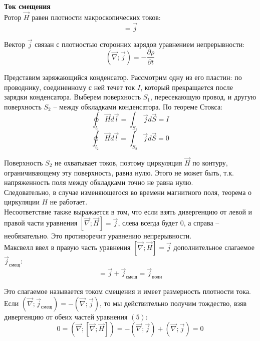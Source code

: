 \documentclass{article}
\begin{document}
	
	\textbf{Ток смещения}\\

	Ротор $\vec H$ равен плотности макроскопических токов:
	\begin{equation}
		[\vec\nabla;\vec H] = \vec j
	\end{equation}

	Вектор $\vec j$ связан с плотностью сторонних зарядов уравнением непрерывности:
	\begin{equation}
		(\vec\nabla;\vec j) = -\frac{\partial\rho}{\partial t}
	\end{equation}

	Представим заряжающийся конденсатор. Рассмотрим одну из его пластин: по проводнику, соединенному с ней течет ток $I$, который прекращается после зарядки конденсатора. Выберем поверхность $S_1$, пересекающую провод, и другую поверхность $S_2$ -- между обкладками конденсатора. По теореме Стокса:
	\begin{equation}
		\oint_{l_1} \vec H d\vec l = \int_{S_1} \vec j d\vec S = I 
	\end{equation}
	\begin{equation}
		\oint_{l_2} \vec H d\vec l = \int_{S_2} \vec j d\vec S = 0 
	\end{equation}

	Поверхность $S_2$ не охватывает токов, поэтому циркуляция $\vec H$ по контуру, ограничивающему эту поверхность, равна нулю. Этого не может быть, т.к. напряженность поля между обкладками точно не равна нулю. \\

	Следовательно, в случае изменяющегося во времени магнитного поля, теорема о циркуляции $H$ не работает. \\

	Несоответствие также выражается в том, что если взять дивергенцию от левой и правой части уравнения $[\vec\nabla;\vec H] = \vec j$, слева всегда будет $0$, а справа -- необязательно. Это противоречит уравнению непрерывности.\\

	Максвелл ввел в правую часть уравнения $[\vec\nabla;\vec H] = \vec j$ дополнительное слагаемое $\vec j_\text{смещ}$:
	\begin{equation}
		[\vec\nabla;\vec H] = \vec j + \vec j_\text{смещ} = \vec j_\text{полн}
	\end{equation}

	Это слагаемое называется током смещения и имеет размерность плотности тока. Если $(\vec\nabla;\vec j_\text{смещ}) = -(\vec\nabla;\vec j)$, то мы действительно получим тождество, взяв дивергенцию от обеих частей уравнения $(5)$:
	\begin{equation}
		0 = (\vec\nabla;[\vec\nabla;\vec H]) = -(\vec\nabla;\vec j) + (\vec\nabla;\vec j) = 0
	\end{equation}
\end{document}
